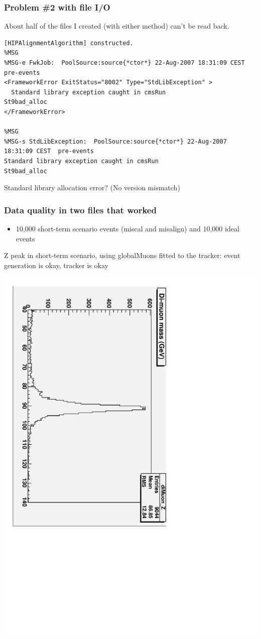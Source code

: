 \documentclass[compress]{beamer}
\begin{document}
\begin{frame}[fragile]
\frametitle{Problem \#2 with file I/O}

About half of the files I created (with either method) can't be read back.

\scriptsize
\begin{verbatim}
[HIPAlignmentAlgorithm] constructed.
%MSG
%MSG-e FwkJob:  PoolSource:source{*ctor*} 22-Aug-2007 18:31:09 CEST pre-events
<FrameworkError ExitStatus="8002" Type="StdLibException" >
  Standard library exception caught in cmsRun
St9bad_alloc
</FrameworkError>

%MSG
%MSG-s StdLibException:  PoolSource:source{*ctor*} 22-Aug-2007 18:31:09 CEST  pre-events
Standard library exception caught in cmsRun
St9bad_alloc
\end{verbatim}

\vfill \normalsize
Standard library allocation error?  (No version mismatch)
\end{frame}

\begin{frame}
\frametitle{Data quality in two files that worked}

\begin{itemize}
\item 10,000 short-term scenario events (miscal and misalign) and 10,000 ideal events
\end{itemize}

Z peak in short-term scenario, using globalMuons fitted to the tracker: event generation is okay, tracker is okay

\begin{center}
\includegraphics[height=0.7\linewidth, angle=90]{deweighted_short_zpeak.pdf}
\end{center}
\end{frame}
\end{document}
